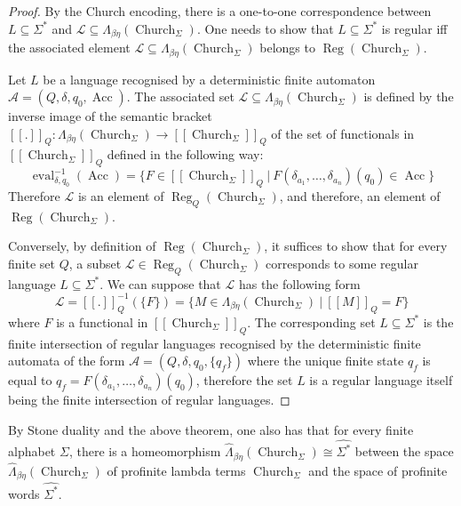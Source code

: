 \documentclass[8pt]{article}
\theoremstyle{definition}
\theoremstyle{definition}
\theoremstyle{definition}
\theoremstyle{definition}
\theoremstyle{definition}
\theoremstyle{definition}
\theoremstyle{definition}
\theoremstyle{definition}
\theoremstyle{definition}
\theoremstyle{definition}
\theoremstyle{definition}
\theoremstyle{definition}
\theoremstyle{definition}
\theoremstyle{definition}
\theoremstyle{question}
\begin{document}
  \begin{proof}
    By the Church encoding, there is a one-to-one correspondence between $L \subseteq \Sigma^*$
    and $\mathcal{L} \subseteq \Lambda_{\beta \eta} (\operatorname{Church}_{\Sigma})$. 
    One needs to show that $L \subseteq \Sigma^*$ is regular iff the associated element 
    $\mathcal{L} \subseteq \Lambda_{\beta \eta} (\operatorname{Church}_{\Sigma})$ belongs to 
    $\operatorname{Reg}(\operatorname{Church}_{\Sigma})$.

    Let $L$ be a language recognised by a deterministic finite automaton 
    $\mathcal{A} = (Q, \delta, q_0, \operatorname{Acc})$. The associated set $\mathcal{L} \subseteq \Lambda_{\beta \eta} (\operatorname{Church}_{\Sigma})$ 
    is defined by the inverse image of the semantic bracket 
    $[\![.]\!]_Q : \Lambda_{\beta \eta}(\operatorname{Church}_{\Sigma}) \to [\![\operatorname{Church}_{\Sigma}]\!]_Q$
    of the set of functionals in $[\![\operatorname{Church}_{\Sigma}]\!]_Q$ defined in the following way:
    \[
    \operatorname{eval}_{\delta,q_0}^{-1}(\operatorname{Acc}) = \{ F \in [\![\operatorname{Church}_{\Sigma}]\!]_Q \: | \: F(\delta_{a_1}, \ldots, \delta_{a_n})(q_0) \in \operatorname{Acc} \}
    \]
    Therefore $\mathcal{L}$ is an element of $\operatorname{Reg}_Q(\operatorname{Church}_{\Sigma})$, and therefore,
    an element of $\operatorname{Reg}(\operatorname{Church}_{\Sigma})$.

    Conversely, by definition of $\operatorname{Reg}(\operatorname{Church}_{\Sigma})$, it suffices to show 
    that for every finite set $Q$, a subset $\mathcal{L} \in \operatorname{Reg}_Q(\operatorname{Church}_{\Sigma})$
    corresponds to some regular language $L \subseteq \Sigma^*$. We can suppose that $\mathcal{L}$ has the following form
    \[
    \mathcal{L} = [\![.]\!]^{-1}_Q(\{ F \}) = \{ M \in \Lambda_{\beta \eta}(\operatorname{Church}_{\Sigma}) \: | \: [\![M]\!]_Q = F \}
    \]
    where $F$ is a functional in $[\![\operatorname{Church}_{\Sigma}]\!]_Q$. The corresponding set $L \subseteq \Sigma^*$
    is the finite intersection of regular languages recognised by the deterministic finite automata of the form
    $\mathcal{A} = (Q, \delta, q_0, \{ q_f \})$ where the unique finite state $q_f$
    is equal to $q_f = F(\delta_{a_1}, \ldots, \delta_{a_n})(q_0)$, therefore the set $L$ is a regular language itself being 
    the finite intersection of regular languages.
  \end{proof}
  By Stone duality and the above theorem, one also has that for every finite alphabet $\Sigma$,
  there is a homeomorphism $\widehat{\Lambda}_{\beta \eta} (\operatorname{Church}_\Sigma) \cong \widehat{\Sigma^*}$
  between the space $\widehat{\Lambda}_{\beta \eta}(\operatorname{Church}_\Sigma)$
  of profinite lambda terms $\operatorname{Church}_{\Sigma}$ and the space of profinite words $\widehat{\Sigma^*}$.
\end{document}

